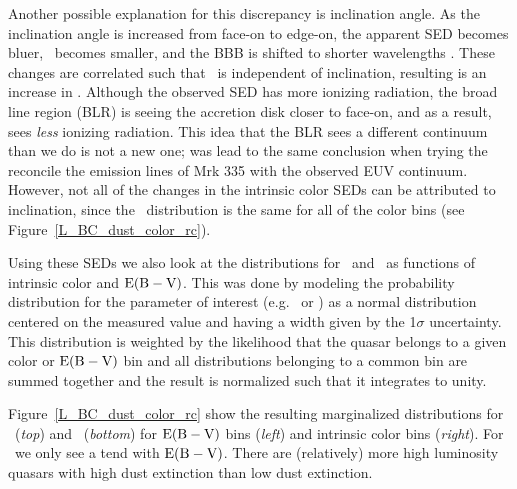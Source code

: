 Another possible explanation for this discrepancy is inclination angle. As the inclination angle is increased from face-on to edge-on, the apparent SED becomes bluer, \ltwofive\ becomes smaller, and the BBB is shifted to shorter wavelengths \citep[see Figure~2 from][]{Sun:1989}.  These changes are correlated such that \lbol\ is independent of inclination, resulting is an increase in \bctwofive.  Although the observed SED has more ionizing radiation, the broad line region (BLR) is seeing the accretion disk closer to face-on, and as a result, sees {\em less} ionizing radiation.  This idea that the BLR sees a different continuum than we do is not a new one; \citet{Korista:1997} was lead to the same conclusion when trying the reconcile the emission lines of Mrk 335 with the observed EUV continuum.
However, not all of the changes in the intrinsic color SEDs can be attributed to inclination, since the \ltwofive\ distribution is the same for all of the color bins (see Figure~\ref{L_BC_dust_color_rc}).

Using these SEDs we also look at the distributions for \ltwofive\ and \bctwofive\ as functions of intrinsic color and ${\rm E(B-V)}$.  This was done by modeling the probability distribution for the parameter of interest (e.g. \ltwofive\ or \bctwofive) as a normal distribution centered on the measured value and having a width given by the 1$\sigma$ uncertainty.  This distribution is weighted by the likelihood that the quasar belongs to a given color or ${\rm E(B-V)}$ bin and all distributions belonging to a common bin are summed together and the result is normalized such that it integrates to unity.

Figure~\ref{L_BC_dust_color_rc} show the resulting marginalized distributions for \ltwofive\ ({\em top}) and \bctwofive\ ({\em bottom}) for ${\rm E(B-V)}$ bins ({\em left}) and intrinsic color bins ({\em right}).  For \ltwofive\ we only see a tend with ${\rm E(B-V)}$.  There are (relatively) more high luminosity quasars with high dust extinction than low dust extinction.


